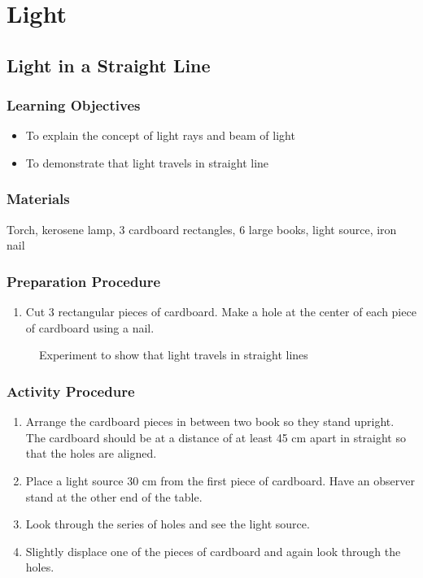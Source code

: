 \section{Light}

\subsection{Light in a Straight Line}

\subsubsection*{Learning Objectives}
\begin{itemize}
\item{To explain the concept of light rays and beam of light} 
\item{To demonstrate that light travels in straight line} 
\end{itemize}

\subsubsection*{Materials}
Torch, kerosene lamp, 3 cardboard rectangles, 6 large books, light source, iron nail

\subsubsection*{Preparation Procedure}
\begin{enumerate}
\item{Cut 3 rectangular pieces of cardboard. Make a hole at the center of each piece of cardboard using a nail.} 
\end{enumerate}

\begin{figure}
\begin{center}
\def\svgwidth{2cm}

\caption{Experiment to show that light travels in straight lines}
\label{fig:prop-of-light}
\end{center}
\end{figure}

\subsubsection*{Activity Procedure}
\begin{enumerate}
\item{Arrange the cardboard pieces in between two book so they stand upright. The cardboard should be at a distance of at least 45 cm apart in straight so that the holes are aligned.} 
\item{Place a light source 30 cm from the first piece of cardboard. Have an observer stand at the other end of the table.} 
\item{Look through the series of holes and see the light source.}
\item{Slightly displace one of the pieces of cardboard and again look through the holes.}
\end{enumerate}

